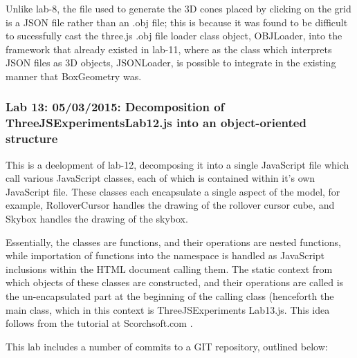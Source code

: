 Unlike lab-8, the file used to generate the 3D cones placed by clicking on the grid is a JSON file rather than an .obj file; this is because it was found to be difficult to sucessfully cast the three.js .obj file loader class object, OBJLoader, into the framework that already existed in lab-11, where as the class which interprets JSON files as 3D objects, JSONLoader, is possible to integrate in the existing manner that BoxGeometry was.

\subsubsection{Lab 13: 05/03/2015: Decomposition of ThreeJSExperiments\textunderscore Lab12.js into an object-oriented structure}
\label{subSubSec:ThreeJSExperiments:Lab13}
This is a deelopment of lab-12, decomposing it into a single JavaScript file which call various JavaScript classes, each of which is contained within it's own JavaScript file. These classes each encapsulate a single aspect of the model, for example, RolloverCursor handles the drawing of the rollover cursor cube, and Skybox handles the drawing of the skybox.

Essentially, the classes are functions, and their operations are nested functions, while importation of functions into the namespace is handled as JavaScript inclusions within the HTML document calling them. The static context from which objects of these classes are constructed, and their operations are called is the un-encapsulated part at the beginning of the calling class (henceforth the main class, which in this context is ThreeJSExperiments Lab13.js. This idea follows from the tutorial at Scorchsoft.com \cite{ScorchSoftJavaScriptObjectOrientation}.

This lab includes a number of commits to a GIT repository, outlined below:

